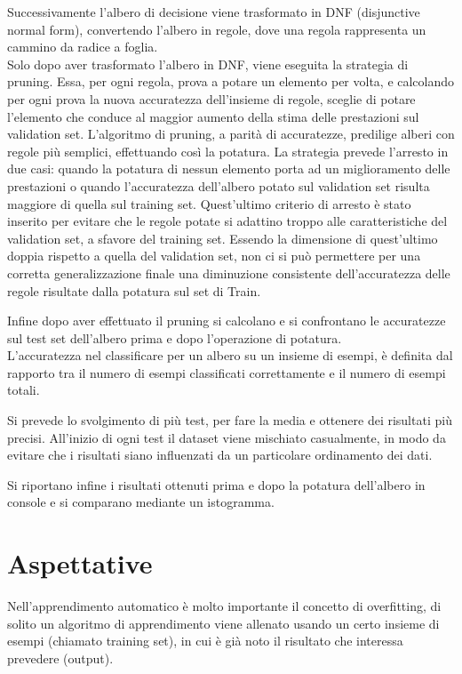 \documentclass[]{article}
\begin{document}
Successivamente l'albero di decisione viene trasformato in DNF (disjunctive normal form), convertendo l'albero in regole, dove una regola rappresenta un cammino da radice a foglia.\\
Solo dopo aver trasformato l'albero in DNF, viene eseguita la strategia di pruning. Essa, per ogni regola, prova a potare un elemento per volta, e calcolando per ogni prova la nuova accuratezza dell'insieme di regole, sceglie di potare l'elemento che conduce  al maggior aumento della stima delle prestazioni sul validation set.
L'algoritmo di pruning, a parità di accuratezze, predilige alberi con regole più semplici, effettuando così la potatura. La strategia prevede l'arresto in due casi: quando la potatura di nessun elemento porta ad un miglioramento delle prestazioni o quando l'accuratezza dell'albero potato sul validation set risulta maggiore di quella sul training set. Quest'ultimo criterio di arresto è stato inserito per evitare che le regole potate si adattino troppo alle caratteristiche del validation set, a sfavore del training set. 
Essendo la dimensione di quest'ultimo doppia rispetto a quella del validation set, non ci si può permettere per una corretta generalizzazione finale una diminuzione consistente dell'accuratezza delle regole risultate dalla potatura sul set di Train.

Infine dopo aver effettuato il pruning si calcolano e si confrontano le accuratezze sul test set dell'albero prima e dopo l'operazione di potatura.\\
L'accuratezza nel classificare per un albero su un insieme di esempi, è definita dal rapporto tra il numero di esempi classificati correttamente e il numero di esempi totali.

Si prevede lo svolgimento di più test, per fare la media e ottenere dei risultati più precisi. All'inizio di ogni test il dataset viene mischiato casualmente, in modo da evitare che i risultati siano influenzati da un particolare ordinamento dei dati.

Si riportano infine i risultati ottenuti prima e dopo la potatura dell'albero in console e si comparano mediante un istogramma. 

\section*{Aspettative}

Nell'apprendimento automatico è molto importante il concetto di overfitting, di solito un algoritmo di apprendimento viene allenato usando un certo insieme di esempi (chiamato training set), in cui è già noto il risultato che interessa prevedere (output).
\end{document}
